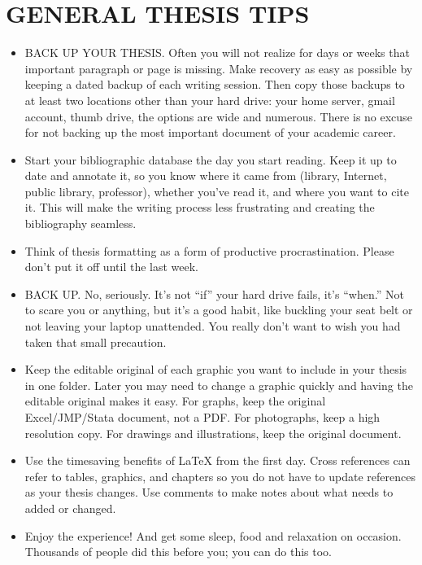 \chapter{GENERAL THESIS TIPS}
\begin{itemize}
\item	BACK UP YOUR THESIS. Often you will not realize for days or weeks that important paragraph or page is missing. Make recovery as easy as possible by keeping a dated backup of each writing session. Then copy those backups to at least two locations other than your hard drive: your home server, gmail account, thumb drive, the options are wide and numerous. There is no excuse for not backing up the most important document of your academic career.
\item	Start your bibliographic database the day you start reading. Keep it up to date and annotate it, so you know where it came from (library, Internet, public library, professor), whether you've read it, and where you want to cite it. This will make the writing process less frustrating and creating the bibliography seamless.
\item	Think of thesis formatting as a form of productive procrastination. Please don't put it off until the last week.
\item	BACK UP. No, seriously. It's not ``if'' your hard drive fails, it's ``when.'' Not to scare you or anything, but it's a good habit, like buckling your seat belt or not leaving your laptop unattended. You really don't want to wish you had taken that small precaution.
\item	Keep the editable original of each graphic you want to include in your thesis in one folder. Later you may need to change a graphic quickly and having the editable original makes it easy. For graphs, keep the original Excel/JMP/Stata document, not a PDF. For photographs, keep a high resolution copy. For drawings and illustrations, keep the original document.
\item	Use the timesaving benefits of LaTeX from the first day. Cross references can refer to tables, graphics, and chapters so you do not have to update references as your thesis changes. Use comments to make notes about what needs to added or changed.
\item	Enjoy the experience! And get some sleep, food and relaxation on occasion. Thousands of people did this before you; you can do this too.
\end{itemize}
